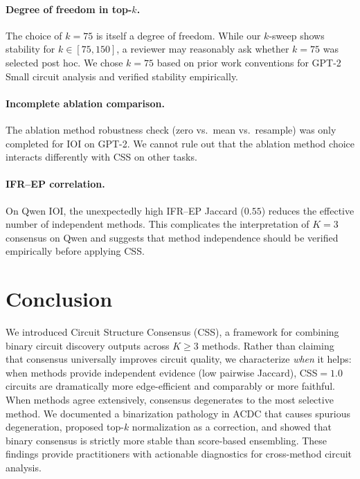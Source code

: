 \documentclass[11pt,a4paper]{article}
\newcommand{\css}{\textsc{CSS}}
\begin{document}
\paragraph{Degree of freedom in top-$k$.}
The choice of $k = 75$ is itself a degree of freedom.
While our $k$-sweep shows stability for $k \in [75, 150]$, a reviewer may reasonably ask whether $k = 75$ was selected post hoc.
We chose $k = 75$ based on prior work conventions for GPT-2 Small circuit analysis and verified stability empirically.

\paragraph{Incomplete ablation comparison.}
The ablation method robustness check (zero vs.\ mean vs.\ resample) was only completed for IOI on GPT-2.
We cannot rule out that the ablation method choice interacts differently with \css{} on other tasks.

\paragraph{IFR--EP correlation.}
On Qwen IOI, the unexpectedly high IFR--EP Jaccard ($0.55$) reduces the effective number of independent methods.
This complicates the interpretation of $K = 3$ consensus on Qwen and suggests that method independence should be verified empirically before applying \css{}.

\section{Conclusion}
\label{sec:conclusion}

We introduced Circuit Structure Consensus (\css{}), a framework for combining binary circuit discovery outputs across $K \geq 3$ methods.
Rather than claiming that consensus universally improves circuit quality, we characterize \emph{when} it helps: when methods provide independent evidence (low pairwise Jaccard), \css{}$=1.0$ circuits are dramatically more edge-efficient and comparably or more faithful.
When methods agree extensively, consensus degenerates to the most selective method.
We documented a binarization pathology in ACDC that causes spurious degeneration, proposed top-$k$ normalization as a correction, and showed that binary consensus is strictly more stable than score-based ensembling.
These findings provide practitioners with actionable diagnostics for cross-method circuit analysis.
\end{document}
